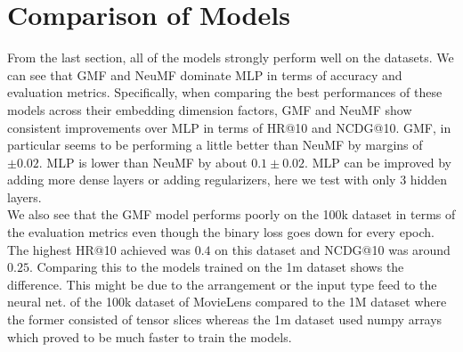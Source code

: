 \documentclass{article}
\begin{document}
\section{Comparison of Models}
From the last section, all of the models strongly perform well on the datasets. We can see that GMF and NeuMF dominate MLP in terms of accuracy and evaluation metrics. Specifically, when comparing the best performances of these models across their embedding dimension factors, GMF and NeuMF show consistent improvements over MLP in terms of HR@10 and NCDG@10. GMF, in particular seems to be performing a little better than NeuMF by margins of $\pm 0.02$. MLP is lower than NeuMF by about $0.1 \pm 0.02$. MLP can be improved by adding more dense layers or adding regularizers, here we test with only 3 hidden layers.\\

We also see that the GMF model performs poorly on the 100k dataset in terms of the evaluation metrics even though the binary loss goes down for every epoch. The highest HR@10 achieved was $0.4$ on this dataset and NCDG@10 was around $0.25$. Comparing this to the models trained on the 1m dataset shows the difference. This might be due to the arrangement or the input type feed to the neural net. of the 100k dataset of MovieLens compared to the 1M dataset where the former consisted of tensor slices whereas the 1m dataset used numpy arrays which proved to be much faster to train the models.\\




%
%
%
%
%
%
\end{document}

